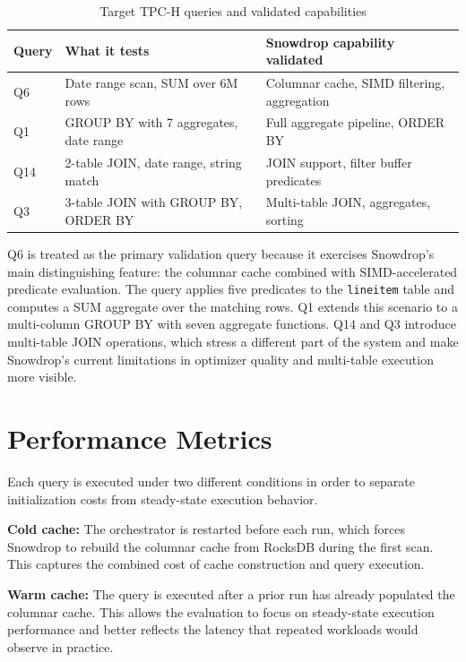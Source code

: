 \begin{table}[H]
\centering
\caption{Target TPC-H queries and validated capabilities}
\label{tab:target-queries}
\renewcommand{\arraystretch}{1.4}
\small
\begin{tabular}{|l|p{4cm}|p{5.5cm}|}
\hline
\textbf{Query} & \textbf{What it tests} & \textbf{Snowdrop capability validated} \\
\hline
Q6  & Date range scan, SUM over 6M rows & Columnar cache, SIMD filtering, aggregation \\
\hline
Q1  & GROUP BY with 7 aggregates, date range & Full aggregate pipeline, ORDER BY \\
\hline
Q14 & 2-table JOIN, date range, string match & JOIN support, filter buffer predicates \\
\hline
Q3  & 3-table JOIN with GROUP BY, ORDER BY & Multi-table JOIN, aggregates, sorting \\
\hline
\end{tabular}
\end{table}

Q6 is treated as the primary validation query because it exercises Snowdrop’s main distinguishing feature: the columnar cache combined with SIMD-accelerated predicate evaluation. The query applies five predicates to the \texttt{lineitem} table and computes a SUM aggregate over the matching rows. Q1 extends this scenario to a multi-column GROUP BY with seven aggregate functions. Q14 and Q3 introduce multi-table JOIN operations, which stress a different part of the system and make Snowdrop’s current limitations in optimizer quality and multi-table execution more visible.

\section{Performance Metrics}

Each query is executed under two different conditions in order to separate initialization costs from steady-state execution behavior.

\textbf{Cold cache:} The orchestrator is restarted before each run, which forces Snowdrop to rebuild the columnar cache from RocksDB during the first scan. This captures the combined cost of cache construction and query execution.

\textbf{Warm cache:} The query is executed after a prior run has already populated the columnar cache. This allows the evaluation to focus on steady-state execution performance and better reflects the latency that repeated workloads would observe in practice.

